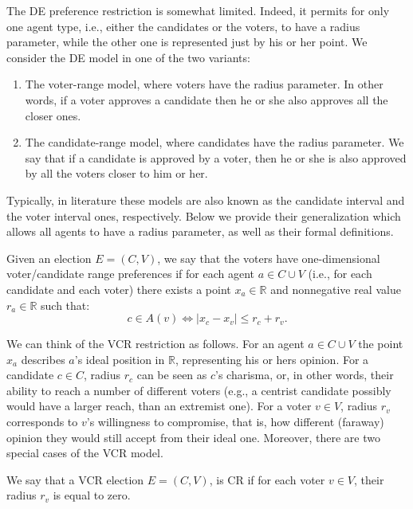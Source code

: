 The DE preference restriction is somewhat limited.
Indeed, it permits for only one agent type, i.e., either the candidates or the voters,
to have a radius parameter, while the other one is represented just by his or her point.
We consider the DE model in one of the two variants:
\begin{enumerate}
    \item The voter-range model, where voters have the radius parameter.
    In other words, if a voter approves a candidate then he or she also approves all the closer ones.

    \item The candidate-range model, where candidates have the radius parameter.
    We say that if a candidate is approved by a voter, then he or she is also approved
    by all the voters closer to him or her.
\end{enumerate}
Typically, in literature these models are also known as the candidate interval and the voter interval ones, respectively.
Below we provide their generalization which allows all agents to have a radius parameter,
as well as their formal definitions.

\begin{pref-restriction}\label{ch2:def:vcr}
Given an election \(E = (C, V)\), we say that the voters have one-dimensional voter/candidate range preferences if
for each agent $a \in C \cup V$ (i.e., for each candidate and each voter)
there exists a point $x_a \in \mathbb{R}$ and nonnegative real value $r_a \in \mathbb{R}$ such that:
\[
    c \in A(v) \Longleftrightarrow |x_c - x_v| \leq r_c + r_v.
\]
\end{pref-restriction}

We can think of the VCR restriction as follows.
For an agent $a \in C \cup V$ the point $x_a$ describes $a$'s ideal position 
in $\mathbb{R}$, representing his or hers opinion. 
For a candidate $c \in C$, radius $r_c$ can be seen as $c$'s charisma,
or, in other words, their ability to reach a number of different voters
(e.g., a centrist candidate possibly would have a larger reach, than an extremist one).
For a voter $v \in V$, radius $r_v$ corresponds to $v$'s willingness to compromise,
that is, how different (faraway) opinion they would still accept from their ideal one.
Moreover, there are two special cases of the VCR model.

\begin{pref-restriction}
We say that a VCR election $E = (C,V)$, 
is CR if for each voter $v \in V$, their radius $r_v$ is equal to zero. 
\end{pref-restriction}

